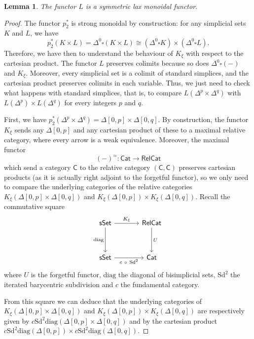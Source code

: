 \documentclass[a4paper,12pt]{amsart}
\theoremstyle{plain}
\newtheorem{lemma}[theorem]{Lemma}%
\theoremstyle{definition}
\theoremstyle{remark}
\begin{document}
\begin{lemma}\label{lemma:laxmonL}
The functor $L$ is a symmetric lax monoidal functor.
\end{lemma}
\begin{proof}
The functor $p_2^*$ is strong monoidal by construction: for any simplicial sets $K$ and $L$, we have
\[
p_2^*(K\times L) = \Delta^0\square (K\times L)\cong (\Delta^0\square K) \times (\Delta^0\square L).
\]
Therefore, we have then to understand the behaviour of $K_{\xi}$ with respect to the cartesian product. The functor $L$ preserves colimits because so does $\Delta^0\square (-)$ and $K_{\xi}$. Moreover, every simplicial set is a colimit of standard simplices, and the cartesian product preserves colimits in each variable. Thus, we just need to check what happens with standard simplices, that is, to compare $L(\Delta^p\times\Delta^q)$ with $L(\Delta^p)\times L(\Delta^q)$ for every integers $p$ and $q$.


First, we have $p_2^*(\Delta^p\times\Delta^q) = \Delta[0,p]\times\Delta[0,q]$. By construction, the functor $K_{\xi}$ sends any $\Delta[0,p]$ and any cartesian product of these to a maximal relative category, where every arrow is a weak equivalence. Moreover, the maximal functor 
\[
(-)^{\simeq}: \mathsf{Cat} \longrightarrow \mathsf{RelCat}
\]
which send a category $\mathsf{C}$ to the relative category  $(\mathsf{C},\mathsf{C})$ preserves cartesian products (as it is actually right adjoint to the forgetful functor), so we only need to compare the underlying categories of the relative categories $K_{\xi}(\Delta[0,p]\times\Delta[0,q])$ and $K_{\xi}(\Delta[0,p])\times K_{\xi}(\Delta[0,q])$. Recall the commutative square
\[
\begin{tikzcd}[column sep=3pc,row sep=3pc]
\mathsf{sSet} \arrow[r, "K_{\xi}"] \arrow[d, "\mathrm{diag}"'] 
  &\mathsf{RelCat} \arrow[d, "U"] \\
\mathsf{sSet} \arrow[r, "c ~ \circ ~\mathrm{Sd}^2"'] 
  & \mathsf{Cat}
\end{tikzcd}
\]
where $U$ is the forgetful functor, $\mathrm{diag}$ the diagonal of bisimplicial sets, $\mathrm{Sd}^2$ the iterated barycentric subdivision and $c$ the fundamental category. 


From this square we can deduce that the underlying categories of
$K_{\xi}(\Delta[0,p]\times\Delta[0,q])$ and $K_{\xi}(\Delta[0,p])\times K_{\xi}(\Delta[0,q])$ are respectively given by $c\mathrm{Sd}^2\mathrm{diag}(\Delta[0,p] \times\Delta[0,q])$ and by the cartesian product $c\mathrm{Sd}^2\mathrm{diag}(\Delta[0,p]) \times c\mathrm{Sd}^2\mathrm{diag}(\Delta[0,q])$.


\end{proof}
\end{document}
